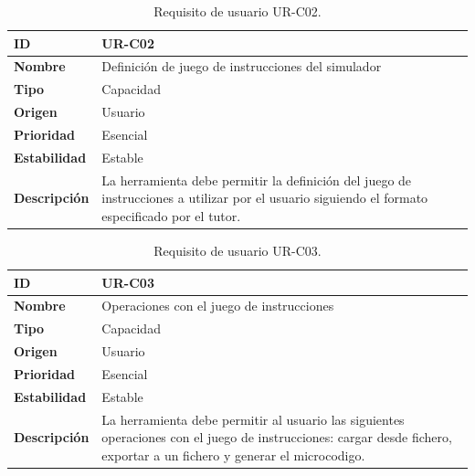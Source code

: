 \begin{center}
\begin{table}[htbp]
\centering
\caption{Requisito de usuario UR-C02.}
\begin{tabular}{@{}p{2.5cm} p{9cm}@{}} 
\toprule
\textbf{ID} 				& UR-C02 \\
\midrule
\textbf{Nombre} 			& Definición de juego de instrucciones del simulador \\
\midrule
\textbf{Tipo} 			& Capacidad \\
\midrule
\textbf{Origen} 			& Usuario \\
\midrule
\textbf{Prioridad}		& Esencial \\
\midrule
\textbf{Estabilidad} 		& Estable \\
\midrule
\textbf{Descripción} 	& La herramienta debe permitir la definición del juego de instrucciones a utilizar por el usuario siguiendo el formato especificado por el tutor. \\
\bottomrule
\end{tabular}
\label{tab:urc02}
\end{table}
\end{center}

\begin{center}
\begin{table}[htbp]
\centering
\caption{Requisito de usuario UR-C03.}
\begin{tabular}{@{}p{2.5cm} p{9cm}@{}} 
\toprule
\textbf{ID} 				& UR-C03 \\
\midrule
\textbf{Nombre} 			& Operaciones con el juego de instrucciones \\
\midrule
\textbf{Tipo} 			& Capacidad \\
\midrule
\textbf{Origen} 			& Usuario \\
\midrule
\textbf{Prioridad}		& Esencial \\
\midrule
\textbf{Estabilidad} 		& Estable \\
\midrule
\textbf{Descripción} 	& La herramienta debe permitir al usuario las siguientes operaciones con el juego de instrucciones: cargar desde fichero, exportar a un fichero y generar el \gls{microcodigo}. \\
\bottomrule
\end{tabular}
\label{tab:urc03}
\end{table}
\end{center}

